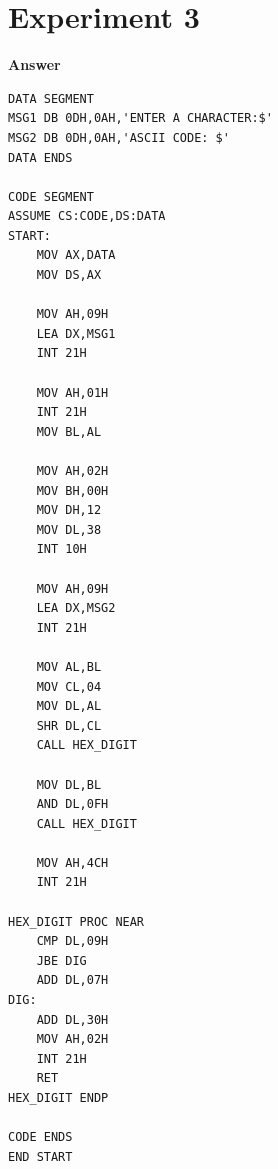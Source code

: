 \documentclass[11pt,a4paper]{article}
\begin{document}
\section*{Experiment 3}
\noindent{}
\vspace{0.4em}
\noindent\textbf{Answer}
\begin{lstlisting}[style=asmbase]
DATA SEGMENT
MSG1 DB 0DH,0AH,'ENTER A CHARACTER:$'
MSG2 DB 0DH,0AH,'ASCII CODE: $'
DATA ENDS

CODE SEGMENT
ASSUME CS:CODE,DS:DATA
START:
    MOV AX,DATA
    MOV DS,AX

    MOV AH,09H
    LEA DX,MSG1
    INT 21H

    MOV AH,01H
    INT 21H
    MOV BL,AL

    MOV AH,02H
    MOV BH,00H
    MOV DH,12
    MOV DL,38
    INT 10H

    MOV AH,09H
    LEA DX,MSG2
    INT 21H

    MOV AL,BL
    MOV CL,04
    MOV DL,AL
    SHR DL,CL
    CALL HEX_DIGIT

    MOV DL,BL
    AND DL,0FH
    CALL HEX_DIGIT

    MOV AH,4CH
    INT 21H

HEX_DIGIT PROC NEAR
    CMP DL,09H
    JBE DIG
    ADD DL,07H
DIG:
    ADD DL,30H
    MOV AH,02H
    INT 21H
    RET
HEX_DIGIT ENDP

CODE ENDS
END START
\end{lstlisting}
\end{document}
